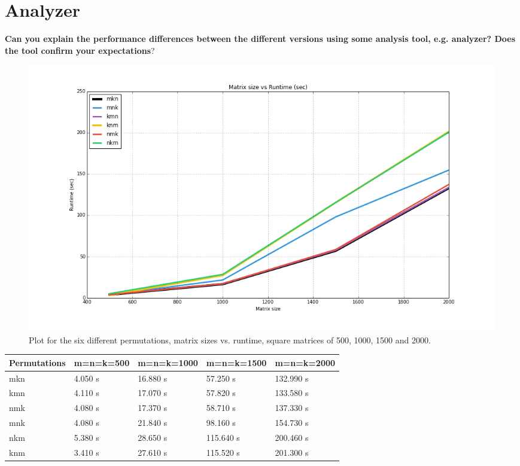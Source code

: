 \documentclass{article}
\begin{document}
\section{Analyzer}

\textbf {Can you explain the performance differences between the different versions using some
analysis tool, e.g. analyzer? Does the tool confirm your expectations}?

\begin{figure}[H]
  \centering
  \includegraphics[scale=0.5]{Runtime.png}
  \caption{Plot for the six different permutations, matrix sizes vs. runtime, square matrices of 500, 1000, 1500 and 2000.}
 \label{fig:plot_runtime}
\end{figure}

\begin{adjustbox}{max width=\textwidth,center}
	\begin{center}
    \begin{tabular}{| l | l | l | l | l |}
    \hline
    Permutations & m=n=k=500 & m=n=k=1000 & m=n=k=1500 & m=n=k=2000  \\ \hline
    mkn & 4.050 s & 16.880 s & 57.250 s & 132.990 s \\ \hline
    kmn & 4.110 s & 17.070 s & 57.820 s & 133.580 s \\ \hline
    nmk & 4.080 s & 17.370 s & 58.710 s & 137.330 s \\ \hline
    mnk & 4.080 s & 21.840 s & 98.160 s & 154.730 s \\ \hline
    nkm & 5.380 s & 28.650 s & 115.640 s & 200.460 s \\ \hline
    knm & 3.410 s & 27.610 s & 115.520 s & 201.300 s \\ \hline
    \end{tabular}
\end{center}
\end{adjustbox}
\end{document}
